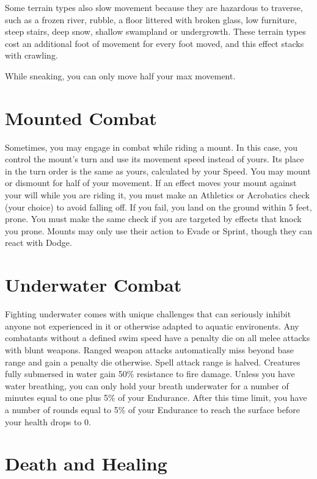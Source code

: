 Some terrain types also slow movement because they are hazardous to traverse, such as a frozen river, rubble, a floor littered with broken glass, low furniture, steep stairs, deep snow, shallow swampland or undergrowth. These terrain types cost an additional foot of movement for every foot moved, and this effect stacks with crawling.

While sneaking, you can only move half your max movement.

\section{Mounted Combat}

Sometimes, you may engage in combat while riding a mount. In this case, you control the mount's turn and use its movement speed instead of yours. Its place in the turn order is the same as yours, calculated by your Speed. You may mount or dismount for half of your movement. If an effect moves your mount against your will while you are riding it, you must make an Athletics or Acrobatics check (your choice) to avoid falling off. If you fail, you land on the ground within 5 feet, prone. You must make the same check if you are targeted by effects that knock you prone. Mounts may only use their action to Evade or Sprint, though they can react with Dodge.

\section{Underwater Combat}

Fighting underwater comes with unique challenges that can seriously inhibit anyone not experienced in it or otherwise adapted to aquatic environents. Any combatants without a defined swim speed have a penalty die on all melee attacks with blunt weapons. Ranged weapon attacks automatically miss beyond base range and gain a penalty die otherwise. Spell attack range is halved. Creatures fully submersed in water gain 50\% resistance to fire damage. Unless you have water breathing, you can only hold your breath underwater for a number of minutes equal to one plus 5\% of your Endurance. After this time limit, you have a number of rounds equal to 5\% of your Endurance to reach the surface before your health drops to 0.

\section{Death and Healing}

